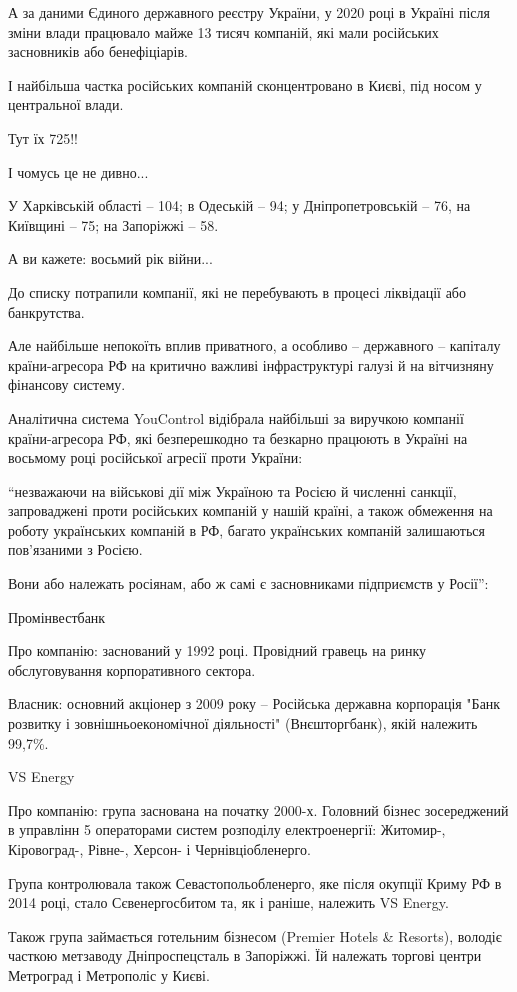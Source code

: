 \begin{itemize}
А за даними Єдиного державного реєстру України, у 2020 році в Україні після
зміни влади працювало майже 13 тисяч компаній, які мали російських засновників
або бенефіціарів.

І найбільша частка російських компаній сконцентровано в Києві, під носом у
центральної влади.

Тут їх 725!!

І чомусь це не дивно...

У Харківській області – 104; в Одеській – 94; у Дніпропетровській – 76, на
Київщині – 75; на Запоріжжі – 58.

А ви кажете: восьмий рік війни...

До списку потрапили компанії, які не перебувають в процесі ліквідації або
банкрутства.

Але найбільше непокоїть вплив приватного, а особливо – державного – капіталу
країни-агресора РФ на критично важливі інфраструктурі галузі й на вітчизняну
фінансову систему.

Аналітична система YouControl відібрала найбільші за виручкою компанії
країни-агресора РФ, які безперешкодно та безкарно працюють в Україні на
восьмому році російської агресії проти України:

“незважаючи на військові дії між Україною та Росією й численні санкції,
запроваджені проти російських компаній у нашій країні, а також обмеження на
роботу українських компаній в РФ, багато українських компаній залишаються
пов’язаними з Росією.

Вони або належать росіянам, або ж самі є засновниками підприємств у Росії”:

Промінвестбанк

Про компанію: заснований у 1992 році. Провідний гравець на ринку обслуговування
корпоративного сектора.

Власник: основний акціонер з 2009 року – Російська державна корпорація "Банк
розвитку і зовнішньоекономічної діяльності" (Внєшторгбанк), якій належить
99,7\%.

VS Energy

Про компанію: група заснована на початку 2000-х. Головний бізнес зосереджений в
управлінн 5 операторами систем розподілу електроенергії: Житомир-, Кіровоград-,
Рівне-, Херсон- і Чернівціобленерго.

Група контролювала також Севастопольобленерго, яке після окупції Криму РФ в
2014 році, стало Сєвенергосбитом та, як і раніше, належить VS Energy.

Також група займається готельним бізнесом (Premier Hotels \& Resorts), володіє
часткою метзаводу Дніпроспецсталь в Запоріжжі. Їй належать торгові центри
Метроград і Метрополіс у Києві.


\end{itemize}
